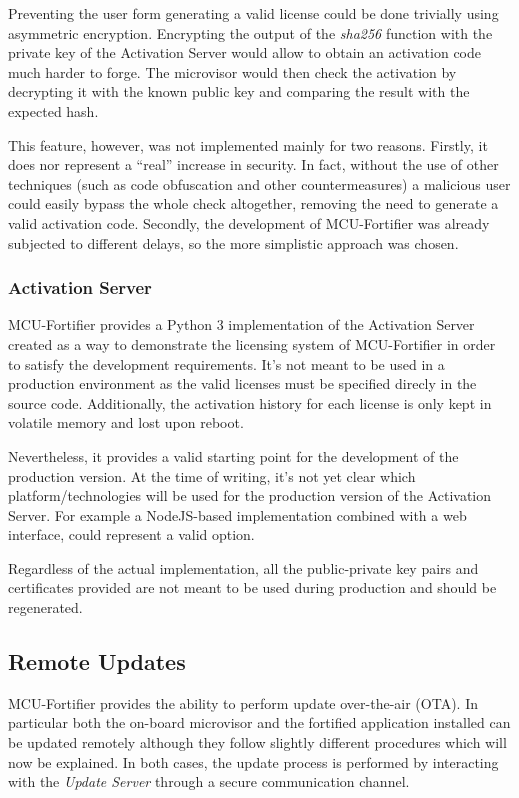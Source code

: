 \documentclass{article}
\begin{document}
Preventing the user form generating a valid license could be done trivially using asymmetric encryption. Encrypting the output of the \textit{sha256} function with the private key of the Activation Server would allow to obtain an activation code much harder to forge. The microvisor would then check the activation by decrypting it with the known public key and comparing the result with the expected hash.

This feature, however, was not implemented mainly for two reasons. Firstly, it does nor represent a ``real'' increase in security. In fact, without the use of other techniques (such as code obfuscation and other countermeasures) a malicious user could easily bypass the whole check altogether, removing the need to generate a valid activation code. Secondly, the development of MCU-Fortifier was already subjected to different delays, so the more simplistic approach was chosen.

\subsubsection{Activation Server}
MCU-Fortifier provides a Python 3 implementation of the Activation Server created as a way to demonstrate the licensing system of MCU-Fortifier in order to satisfy the development requirements. It's not meant to be used in a production environment as the valid licenses must be specified direcly in the source code. Additionally, the activation history for each license is only kept in volatile memory and lost upon reboot.

Nevertheless, it provides a valid starting point for the development of the production version. At the time of writing, it's not yet clear which platform/technologies will be used for the production version of the Activation Server. For example a NodeJS-based implementation combined with a web interface, could represent a valid option.

Regardless of the actual implementation, all the public-private key pairs and certificates provided are not meant to be used during production and should be regenerated.

\subsection{Remote Updates}
\label{subsec:OTA}
MCU-Fortifier provides the ability to perform update over-the-air (OTA). In particular both the on-board microvisor and the fortified application installed can be updated remotely although they follow slightly different procedures which will now be explained.
In both cases, the update process is performed by interacting with the \textit{Update Server} through a secure communication channel.
\end{document}
